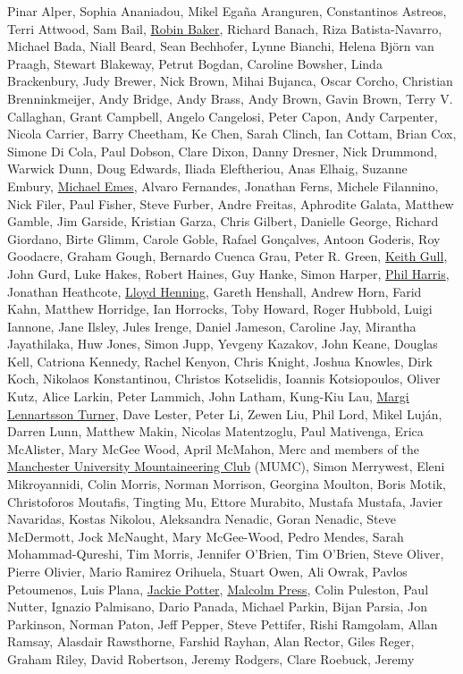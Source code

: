 \documentclass[
]{book}
\begin{document}
Pinar Alper, Sophia Ananiadou, Mikel Egaña Aranguren, Constantinos Astreos, Terri Attwood, Sam Bail, \href{https://en.wikipedia.org/wiki/Robin_Baker_(biologist)}{Robin Baker}, Richard Banach, Riza Batista-Navarro, Michael Bada, Niall Beard, Sean Bechhofer, Lynne Bianchi, Helena Björn van Praagh, Stewart Blakeway, Petrut Bogdan, Caroline Bowsher, Linda Brackenbury, Judy Brewer, Nick Brown, Mihai Bujanca, Oscar Corcho, Christian Brenninkmeijer, Andy Bridge, Andy Brass, Andy Brown, Gavin Brown, Terry V. Callaghan, Grant Campbell, Angelo Cangelosi, Peter Capon, Andy Carpenter, Nicola Carrier, Barry Cheetham, Ke Chen, Sarah Clinch, Ian Cottam, Brian Cox, Simone Di Cola, Paul Dobson, Clare Dixon, Danny Dresner, Nick Drummond, Warwick Dunn, Doug Edwards, Iliada Eleftheriou, Anas Elhaig, Suzanne Embury, \href{https://www.uoguelph.ca/mcb/people/dr-michael-j-emes}{Michael Emes}, Alvaro Fernandes, Jonathan Ferns, Michele Filannino, Nick Filer, Paul Fisher, Steve Furber, Andre Freitas, Aphrodite Galata, Matthew Gamble, Jim Garside, Kristian Garza, Chris Gilbert, Danielle George, Richard Giordano, Birte Glimm, Carole Goble, Rafael Gonçalves, Antoon Goderis, Roy Goodacre, Graham Gough, Bernardo Cuenca Grau, Peter R. Green, \href{https://en.wikipedia.org/wiki/Keith_Gull}{Keith Gull}, John Gurd, Luke Hakes, Robert Haines, Guy Hanke, Simon Harper, \href{https://www.coventry.ac.uk/research/research-people/professor-phil-harris/}{Phil Harris}, Jonathan Heathcote, \href{https://github.com/eldog}{Lloyd Henning}, Gareth Henshall, Andrew Horn, Farid Kahn, Matthew Horridge, Ian Horrocks, Toby Howard, Roger Hubbold, Luigi Iannone, Jane Ilsley, Jules Irenge, Daniel Jameson, Caroline Jay, Mirantha Jayathilaka, Huw Jones, Simon Jupp, Yevgeny Kazakov, John Keane, Douglas Kell, Catriona Kennedy, Rachel Kenyon, Chris Knight, Joshua Knowles, Dirk Koch, Nikolaos Konstantinou, Christos Kotselidis, Ioannis Kotsiopoulos, Oliver Kutz, Alice Larkin, Peter Lammich, John Latham, Kung-Kiu Lau, \href{https://pureportal.coventry.ac.uk/en/persons/margi-lennartsson-turner}{Margi Lennartsson Turner}, Dave Lester, Peter Li, Zewen Liu, Phil Lord, Mikel Luján, Darren Lunn, Matthew Makin, Nicolas Matentzoglu, Paul Mativenga, Erica McAlister, Mary McGee Wood, April McMahon, Merc and members of the \href{https://www.mumc.me.uk/wordpress}{Manchester University Mountaineering Club} (MUMC), Simon Merrywest, Eleni Mikroyannidi, Colin Morris, Norman Morrison, Georgina Moulton, Boris Motik, Christoforos Moutafis, Tingting Mu, Ettore Murabito, Mustafa Mustafa, Javier Navaridas, Kostas Nikolou, Aleksandra Nenadic, Goran Nenadic, Steve McDermott, Jock McNaught, Mary McGee-Wood, Pedro Mendes, Sarah Mohammad-Qureshi, Tim Morris, Jennifer O'Brien, Tim O'Brien, Steve Oliver, Pierre Olivier, Mario Ramirez Orihuela, Stuart Owen, Ali Owrak, Pavlos Petoumenos, Luis Plana, \href{https://www.brookes.ac.uk/ocsld/about-ocsld/staff-profiles/jackie-potter/}{Jackie Potter}, \href{https://en.wikipedia.org/wiki/Malcolm_Press}{Malcolm Press}, Colin Puleston, Paul Nutter, Ignazio Palmisano, Dario Panada, Michael Parkin, Bijan Parsia, Jon Parkinson, Norman Paton, Jeff Pepper, Steve Pettifer, Rishi Ramgolam, Allan Ramsay, Alasdair Rawsthorne, Farshid Rayhan, Alan Rector, Giles Reger, Graham Riley, David Robertson, Jeremy Rodgers, Clare Roebuck, Jeremy 
\end{document}
